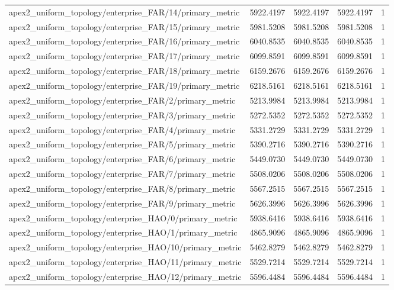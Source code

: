 \begin{table}[h]
\begin{tabular}{lrrrr}
apex2_uniform_topology/enterprise_FAR/14/primary_metric & 5922.4197 & 5922.4197 & 5922.4197 & 1 \\
apex2_uniform_topology/enterprise_FAR/15/primary_metric & 5981.5208 & 5981.5208 & 5981.5208 & 1 \\
apex2_uniform_topology/enterprise_FAR/16/primary_metric & 6040.8535 & 6040.8535 & 6040.8535 & 1 \\
apex2_uniform_topology/enterprise_FAR/17/primary_metric & 6099.8591 & 6099.8591 & 6099.8591 & 1 \\
apex2_uniform_topology/enterprise_FAR/18/primary_metric & 6159.2676 & 6159.2676 & 6159.2676 & 1 \\
apex2_uniform_topology/enterprise_FAR/19/primary_metric & 6218.5161 & 6218.5161 & 6218.5161 & 1 \\
apex2_uniform_topology/enterprise_FAR/2/primary_metric & 5213.9984 & 5213.9984 & 5213.9984 & 1 \\
apex2_uniform_topology/enterprise_FAR/3/primary_metric & 5272.5352 & 5272.5352 & 5272.5352 & 1 \\
apex2_uniform_topology/enterprise_FAR/4/primary_metric & 5331.2729 & 5331.2729 & 5331.2729 & 1 \\
apex2_uniform_topology/enterprise_FAR/5/primary_metric & 5390.2716 & 5390.2716 & 5390.2716 & 1 \\
apex2_uniform_topology/enterprise_FAR/6/primary_metric & 5449.0730 & 5449.0730 & 5449.0730 & 1 \\
apex2_uniform_topology/enterprise_FAR/7/primary_metric & 5508.0206 & 5508.0206 & 5508.0206 & 1 \\
apex2_uniform_topology/enterprise_FAR/8/primary_metric & 5567.2515 & 5567.2515 & 5567.2515 & 1 \\
apex2_uniform_topology/enterprise_FAR/9/primary_metric & 5626.3996 & 5626.3996 & 5626.3996 & 1 \\
apex2_uniform_topology/enterprise_HAO/0/primary_metric & 5938.6416 & 5938.6416 & 5938.6416 & 1 \\
apex2_uniform_topology/enterprise_HAO/1/primary_metric & 4865.9096 & 4865.9096 & 4865.9096 & 1 \\
apex2_uniform_topology/enterprise_HAO/10/primary_metric & 5462.8279 & 5462.8279 & 5462.8279 & 1 \\
apex2_uniform_topology/enterprise_HAO/11/primary_metric & 5529.7214 & 5529.7214 & 5529.7214 & 1 \\
apex2_uniform_topology/enterprise_HAO/12/primary_metric & 5596.4484 & 5596.4484 & 5596.4484 & 1 \\

\end{tabular}
\end{table}
